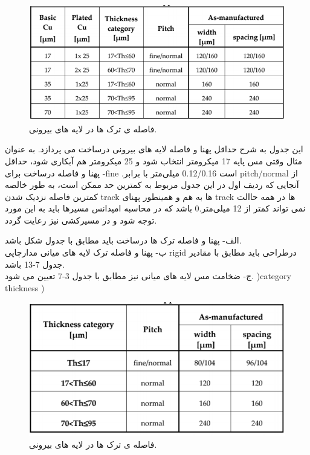 \begin{figure}[!h]
	\centering
	\includegraphics[width=0.7\linewidth]{Assets/pcbmintrackouther.png}
	\caption{فاصله ی ترک ها در لایه های بیرونی.}
	\label{fig:pcbmintrackouther}
\end{figure}

این جدول به شرح حداقل پهنا و فاصله لایه های بیرونی درساخت می پردازد. به عنوان مثال وقتی
مس پایه 17 میکرومتر انتخاب شود و 25 میکرومتر هم آبکاری شود، حداقل پهنا و فاصله درساخت برای -fine
.است 0.12/0.16 میلی‌متر با برابر pitch/normal
از آنجایی که ردیف اول در این جدول مربوط به کمترین حد ممکن است، به طور خالصه کمترین فاصله
نزدیک شدن track ها به هم و همینطور پهنای track ها در همه حاالت نمی تواند کمتر از 12 میلی‌متر.0
باشد که در محاسبه امپدانس مسیرها باید به این مورد توجه شود و در مسیرکشی نیز رعایت گردد.


الف- پهنا و فاصله ترک ها درساخت باید مطابق با جدول شکل  باشد.\\
ب- پهنا و فاصله ترک لایه های میانی مدارچاپی rigid درطراحی باید مطابق با مقادیر جدول 7-13
باشد.\\
ج- ضخامت مس لایه های میانی نیز مطابق با جدول 3-7 تعیین می شود. )category thickness )\\

\begin{figure}[!h]
	\centering
	\includegraphics[width=0.7\linewidth]{Assets/pcbinternaltrack.png}
	\caption{فاصله ی ترک ها در لایه های بیرونی.}
	\label{fig:pcbinternaltrack}
\end{figure}

